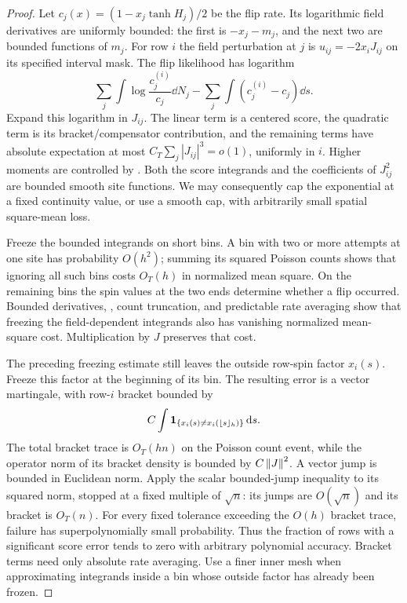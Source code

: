\begin{proof}
Let $c_j(x)=(1-x_j\tanh H_j)/2$ be the flip rate.  Its logarithmic
field derivatives are uniformly bounded: the first is $-x_j-m_j$,
and the next two are bounded functions of $m_j$.  For row $i$ the
field perturbation at $j$ is $u_{ij}=-2x_iJ_{ij}$ on its specified
interval mask.  The flip likelihood has logarithm
\[
 \sum_j\int\log\frac{c_j^{(i)}}{c_j}\dd N_j
                    -\sum_j\int(c_j^{(i)}-c_j)\dd s.
\]
Expand this logarithm in $J_{ij}$.  The linear term is a centered
score, the quadratic term is its bracket/compensator contribution,
and the remaining terms have absolute expectation at most
$C_T\sum_j|J_{ij}|^3=o(1)$, uniformly in $i$.  Higher moments are
controlled by .  Both the score
integrands and the coefficients of $J_{ij}^2$ are bounded smooth
site functions.  We may consequently cap the exponential at a fixed
continuity value, or use a smooth cap, with arbitrarily small spatial
square-mean loss.

Freeze the bounded integrands on short bins.  A bin with two or more
attempts at one site has probability $O(h^2)$; summing its squared
Poisson counts shows that ignoring all such bins costs $O_T(h)$ in
normalized mean square.  On the remaining bins the spin values at the
two ends determine whether a flip occurred.  Bounded derivatives,
, count truncation, and predictable rate
averaging show that freezing the field-dependent integrands also has
vanishing normalized mean-square cost.  Multiplication by $J$
preserves that cost.

The preceding freezing estimate still leaves the outside row-spin
factor $x_i(s)$.  Freeze this factor at the beginning of its bin.
The resulting error is a vector martingale, with row-$i$ bracket
bounded by
\[
 C\int\mathbf 1_{\{x_i(s)\ne x_i(\lfloor s\rfloor_h)\}}\,\mathrm d s.
\]
The total bracket trace is $O_T(hn)$ on the Poisson count event, while
the operator norm of its bracket density is bounded by $C\left\lVert J\right\rVert^2$.
A vector jump is bounded in Euclidean norm.  Apply the scalar
bounded-jump inequality to its squared norm, stopped at a fixed
multiple of $\sqrt n$: its jumps are $O(\sqrt n)$ and its bracket
is $O_T(n)$.  For every fixed tolerance exceeding the $O(h)$ bracket
trace, failure has superpolynomially small probability.  Thus the
fraction of rows with a significant score error tends to zero with
arbitrary polynomial accuracy.  Bracket terms need only absolute
rate averaging.  Use a finer inner mesh when approximating integrands
inside a bin whose outside factor has already been frozen.


\end{proof}
